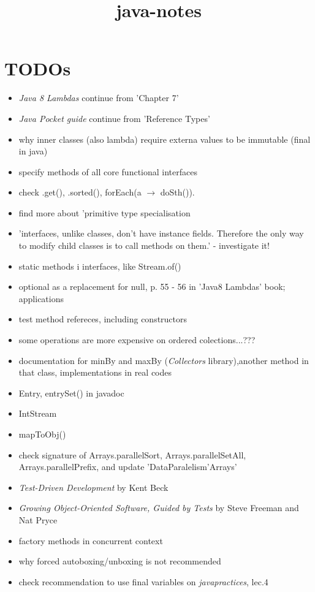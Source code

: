 \documentclass{report}
\title{java-notes}
\begin{document}
\tableofcontents



\chapter{TODOs}
\begin{itemize}
	\item \textit{Java 8 Lambdas} continue from 'Chapter 7'
	\item \textit{Java Pocket guide} continue from  'Reference Types'
	\item why inner classes (also lambda) require externa values  to be immutable (final in java)
	\item specify methods of all core functional interfaces
	\item check .get(), .sorted(), forEach(a $\rightarrow$ doSth()).
	\item find more about 'primitive type specialisation
	\item 'interfaces, unlike classes, don't have instance fields. Therefore the only way to modify child classes is to call methods on them.' - investigate it!
	\item static methods i interfaces, like Stream.of()
	\item  optional as a replacement for null, p. 55 - 56 in 'Java8 Lambdas' book; applications
	\item test method refereces, including constructors
	\item some operations are more expensive on ordered colections...???
	\item documentation for minBy and maxBy (\textit{Collectors} library),another method in that class, implementations in real codes
	\item Entry, entrySet() in javadoc
	\item IntStream
	\item mapToObj()
	\item check signature of Arrays.parallelSort, Arrays.parallelSetAll, Arrays.parallelPrefix, and update 'DataParalelism'Arrays'
	\item \textit{Test-Driven Development} by Kent Beck
	\item \textit{Growing Object-Oriented Software, Guided by Tests} by Steve Freeman and Nat Pryce 
	\item factory methods in concurrent context
	\item why forced autoboxing/unboxing is not recommended
	\item check recommendation to use final variables on \textit{javapractices}, lec.4
\end{itemize}
\end{document}
